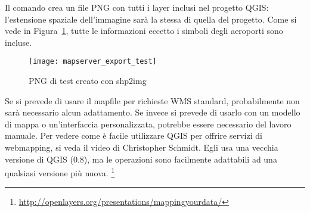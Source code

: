 Il comando crea un file PNG con tutti i layer inclusi nel progetto QGIS: l'estensione spaziale dell'immagine
sarà la stessa di quella del progetto. 
Come si vede in Figura~\ref{fig:mapserver_export_test}, tutte le informazioni eccetto i simboli 
degli aeroporti sono incluse.

\begin{figure}[ht]
\centering
  \texttt{[image: mapserver\_export\_test]}
  \caption{PNG di test creato con shp2img \nixcaption}
  \label{fig:mapserver_export_test}
\end{figure}

Se si prevede di usare il mapfile per richieste WMS standard, probabilmente non sarà necessario alcun adattamento. 
Se invece si prevede di usarlo con un modello di mappa o un'interfaccia personalizzata, potrebbe essere 
necessario del lavoro manuale. Per vedere come è facile utilizzare QGIS per offrire servizi di webmapping, 
si veda il video di Christopher Schmidt. Egli usa una vecchia versione di QGIS (0.8), 
ma le operazioni sono facilmente adattabili ad una qualsiasi versione più nuova.
\footnote{\url{http://openlayers.org/presentations/mappingyourdata/}}

\FloatBarrier